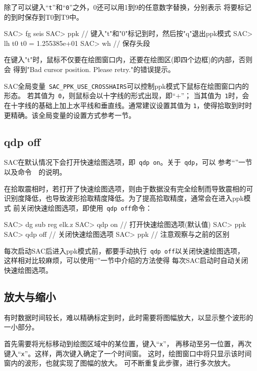 除了可以键入``\verb+t+''和``\verb+0+''之外，0还可以用1到9的任意数字替换，分别表示
将要标记的到时保存到T0到T9中。

\begin{SACCode}
SAC> fg seis
SAC> ppk
// 键入"t"和"0"标记到时，然后按"q"退出ppk模式
SAC> lh t0
     t0 = 1.255385e+01
SAC> wh         // 保存头段
\end{SACCode}

\begin{note}
在键入"t"时，鼠标不仅要在绘图窗口内，还要在绘图区(即四个边框)的内部，否则会
得到"Bad cursor position. Please retry."的错误提示。
\end{note}

\begin{note}
SAC全局变量~\verb+SAC_PPK_USE_CROSSHAIRS+可以控制ppk模式下鼠标在绘图窗口内的形态。
若其值为~\verb+0+，则鼠标会以十字线的形式出现，即“{\Large$+$}”；
当其值为~\verb+1+时，会在十字线的基础上加上水平线和垂直线。通常建议设置其值为
\verb+1+，使得拾取到时时更精确。该全局变量的设置方式参考一节。
\end{note}

\subsection{qdp off}
SAC在默认情况下会打开快速绘图选项，即~\verb+qdp on+。关于~\verb+qdp+，可以
参考``''一节以及命令~~的说明。

在拾取震相时，若打开了快速绘图选项，则由于数据没有完全绘制而导致震相的可
识别度降低，也导致波形拾取精度降低。为了提高拾取精度，通常会在进入ppk模式
前关闭快速绘图选项，即使用~\verb+qdp off+命令：
\begin{SACCode}
SAC> dg sub reg elk.z
SAC> qdp on     // 打开快速绘图选项(默认值)
SAC> ppk
SAC> qdp off    // 关闭快速绘图选项
SAC> ppk        // 注意观察与之前的区别
\end{SACCode}
每次启动SAC后进入ppk模式前，都要手动执行~\verb+qdp off+以关闭快速绘图选项，
这样相对比较麻烦，可以使用``''一节中介绍的方法使得
每次SAC启动时自动关闭快速绘图选项。

\subsection{放大与缩小}
有时数据时间较长，难以精确标定到时，此时需要将图幅放大，以显示整个波形的一小部分。

首先需要将光标移动到绘图区域中的某位置，键入``\verb+x+''，
再移动至另一位置，再次键入``\verb+x+''。这样，两次键入确定了一个时间窗。
这时，绘图窗口中将只显示该时间窗内的波形，也就实现了图幅的放大。
可不断重复此步骤，进行多次放大。

